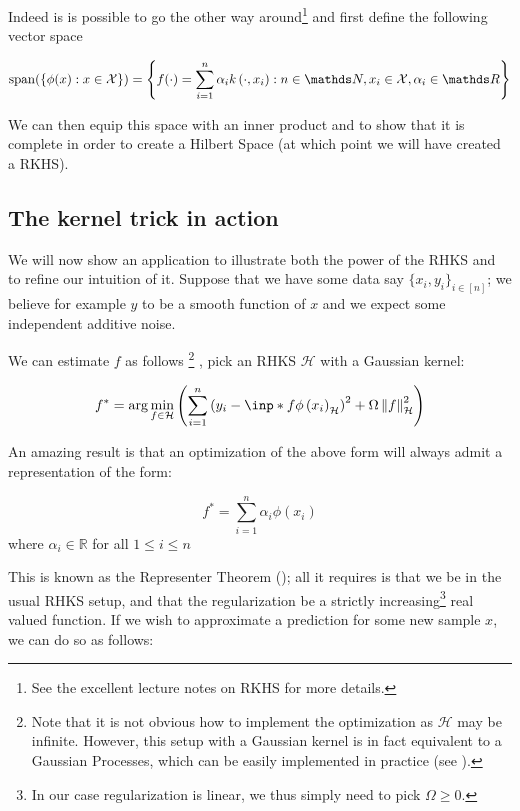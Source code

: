 Indeed is is possible to go the other way around\footnote{See the excellent lecture notes on 
RKHS \cite{BartlettNotes} for more details.} and first define the following vector space

\begin{equation}
    \operatorname{span}(\{\phi(x): x \in \mathcal{X}\})=\left\{f(\cdot)=
    \sum_{i=1}^{n} \alpha_{i} k\left(\cdot, x_{i}\right): n \in \N, x_{i} 
    \in \mathcal{X}, \alpha_{i} \in \R\right\}
\end{equation}

We can then equip this space with an inner product and to show that it is complete in order to create
a Hilbert Space (at which point we will have created a RKHS). 

\subsection{The kernel trick in action}

We will now show an application to illustrate both the power of the RHKS and to refine our intuition of it. 
Suppose that we have 
some data say $\{ x_i, y_i\}_{i \in [n]}$; we believe for example $y$ to be a smooth function of $x$ and we 
expect some independent additive noise.

We can estimate $f$ as follows
\footnote{Note that it is not obvious how to implement the optimization as $\mathcal{H}$ may be infinite. However,
this setup with a Gaussian kernel is in fact equivalent to a Gaussian Processes, which can be easily
implemented in practice (see \cite{JordanNotes}).}
, pick an RHKS $\mathcal{H}$ with a Gaussian kernel:

\begin{equation}
    f^{*}=\arg \min _{f \in \mathcal{H}}\left(
        \sum_{i=1}^{n} 
        \left(y_{i} - \inp*{f}{\phi\left(x_{i}\right)}_{\mathcal{H}} \right)^{2}
        + \Omega \norm{f}_{\mathcal{H}}^{2}\right)
\end{equation}

An amazing result is that an optimization of the above form will always admit a representation of the
form:

\[
    f^{*} = \sum_{i=1}^{n} \alpha_{i} \phi\left(x_{i}\right)
\]
where $\alpha_{i} \in \mathbb{R}$ for all $1 \leq i \leq n$

This is known as the Representer Theorem (\cite{scholkopf2001generalized}); all it requires is that we be in the usual RHKS setup, and that
the regularization be a strictly increasing\footnote{In our case regularization is linear,
we thus simply need to pick $\Omega \geq 0$.} real valued function.
If we wish to approximate a prediction for some new sample $x$, we can do so as follows:


